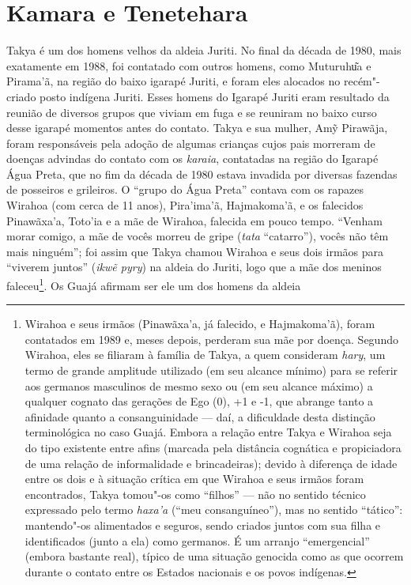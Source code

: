 \section{Kamara e Tenetehara}\label{kamara-e-tenetehara}

Takya é um dos homens velhos da aldeia Juriti. No final da década de
1980, mais exatamente em 1988, foi contatado com outros homens, como
Muturuhu͂a e Pirama'ã, na região do baixo igarapé Juriti, e foram eles
alocados no recém"-criado posto indígena Juriti. Esses homens do Igarapé
Juriti eram resultado da reunião de diversos grupos que viviam em fuga e
se reuniram no baixo curso desse igarapé momentos antes do contato.
Takya e sua mulher, Amỹ Pirawãja, foram responsáveis pela adoção de
algumas crianças cujos pais morreram de doenças advindas do contato com
os \emph{karaia}, contatadas na região do Igarapé Água Preta, que no fim
da década de 1980 estava invadida por diversas fazendas de posseiros e
grileiros. O ``grupo do Água Preta'' contava com os rapazes Wirahoa (com
cerca de 11 anos), Pira'ima'ã, Hajmakoma'ã, e os falecidos Pinawãxa'a,
Toto'ia e a mãe de Wirahoa, falecida em pouco tempo. ``Venham morar
comigo, a mãe de vocês morreu de gripe (\emph{tata} ``catarro''), vocês
não têm mais ninguém''; foi assim que Takya chamou Wirahoa e seus dois
irmãos para ``viverem juntos'' (\emph{ikwẽ pyry}) na aldeia do  Juriti,
logo que a mãe dos meninos faleceu\footnote{Wirahoa e seus irmãos
  (Pinawãxa'a, já falecido, e Hajmakoma'ã), foram contatados em 1989 e,
  meses depois, perderam sua mãe por doença. Segundo Wirahoa, eles se
  filiaram à família de Takya, a quem consideram \emph{hary}, um termo
  de grande amplitude utilizado (em seu alcance mínimo) para se referir
  aos germanos masculinos de mesmo sexo ou (em seu alcance máximo) a
  qualquer cognato das gerações de Ego (0), +1 e -1, que abrange
  tanto a afinidade quanto a consanguinidade --- daí, a dificuldade desta
  distinção terminológica no caso Guajá. Embora a relação entre Takya e
  Wirahoa seja do tipo existente entre afins (marcada pela distância
  cognática e propiciadora de uma relação de informalidade e
  brincadeiras); devido à diferença de idade entre os dois e à situação
  crítica em que Wirahoa e seus irmãos foram encontrados, Takya tomou"-os
  como ``filhos'' --- não no sentido técnico expressado pelo termo
  \emph{haxa'a} (``meu consanguíneo''), mas no sentido ``tático'':
  mantendo"-os alimentados e seguros, sendo criados juntos com sua filha
  e identificados (junto a ela) como germanos. É um arranjo
  ``emergencial'' (embora bastante real), típico de uma situação genocida
  como as que ocorrem durante o contato entre os Estados nacionais e os
  povos indígenas.}. Os Guajá afirmam ser ele um dos homens da aldeia
